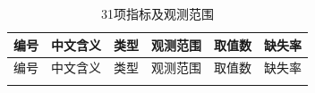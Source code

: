 \documentclass{sufethesismas}
\begin{document}
{
\footnotesize
\begin{longtable}[]{@{}
  >{\raggedright\arraybackslash}p{}
  >{\raggedright\arraybackslash}p{}
  >{\raggedright\arraybackslash}p{}
  >{\raggedright\arraybackslash}p{}
  >{\raggedright\arraybackslash}p{}
  >{\raggedright\arraybackslash}p{}@{}}
\caption{31项指标及观测范围}\tabularnewline
\toprule\noalign{}
\begin{minipage}[b]{\linewidth}\raggedright
编号
\end{minipage} & \begin{minipage}[b]{\linewidth}\raggedright
中文含义
\end{minipage} & \begin{minipage}[b]{\linewidth}\raggedright
类型
\end{minipage} & \begin{minipage}[b]{\linewidth}\raggedright
观测范围
\end{minipage} & \begin{minipage}[b]{\linewidth}\raggedright
取值数
\end{minipage} & \begin{minipage}[b]{\linewidth}\raggedright
缺失率
\end{minipage} \\
\midrule\noalign{}
\endfirsthead
\toprule\noalign{}
\begin{minipage}[b]{\linewidth}\raggedright
编号
\end{minipage} & \begin{minipage}[b]{\linewidth}\raggedright
中文含义
\end{minipage} & \begin{minipage}[b]{\linewidth}\raggedright
类型
\end{minipage} & \begin{minipage}[b]{\linewidth}\raggedright
观测范围
\end{minipage} & \begin{minipage}[b]{\linewidth}\raggedright
取值数
\end{minipage} & \begin{minipage}[b]{\linewidth}\raggedright
缺失率
\end{minipage} \\
\midrule\noalign{}
\endhead
\bottomrule\noalign{}
\endlastfoot

\end{longtable}}
\end{document}
